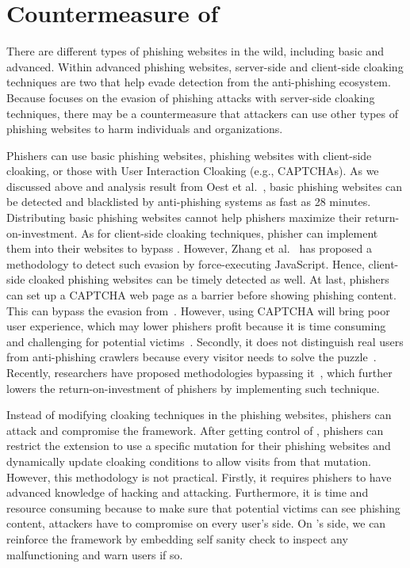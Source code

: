 \section{Countermeasure of \spartacus}


There are different types of phishing websites in the wild, including basic and advanced.
Within advanced phishing websites, server-side and client-side cloaking techniques are two that help evade detection from the anti-phishing ecosystem.
Because \spartacus focuses on the evasion of phishing attacks with server-side cloaking techniques,
there may be a countermeasure that attackers can use other types of phishing websites to harm individuals and organizations.

Phishers can use basic phishing websites, phishing websites with client-side cloaking, or those with User Interaction Cloaking (e.g., CAPTCHAs).
As we discussed above and analysis result from Oest et al.~\cite{oest2020phishtime}, basic phishing websites can be detected and blacklisted by anti-phishing systems as fast as 28 minutes.
Distributing basic phishing websites cannot help phishers maximize their return-on-investment.
As for client-side cloaking techniques,
phisher can implement them into their websites to bypass \spartacus.
However, Zhang et al.~\cite{zhang2021crawlphish} has proposed a methodology to detect such evasion by force-executing JavaScript.
Hence, client-side cloaked phishing websites can be timely detected as well.
At last, phishers can set up a CAPTCHA web page as a barrier before showing phishing content.
This can bypass the evasion from~\spartacus.
However, using CAPTCHA will bring poor user experience, which may lower phishers profit because it is time consuming and challenging for potential victims~\cite{captcha}.
Secondly, it does not distinguish real users from anti-phishing crawlers because every visitor needs to solve the puzzle~\cite{captcha}.
Recently, researchers have proposed methodologies bypassing it~\cite{sivakorn2016m,stark2015captcha, zhang2021crawlphish}, which further lowers the return-on-investment of phishers by implementing such technique.

Instead of modifying cloaking techniques in the phishing websites,
phishers can attack and compromise the \spartacus framework.
After getting control of \spartacus, phishers can restrict the extension to use a specific mutation for their phishing websites and dynamically update cloaking conditions to allow visits from that mutation.
However, this methodology is not practical.
Firstly, it requires phishers to have advanced knowledge of hacking and attacking.
Furthermore, it is time and resource consuming because to make sure that potential victims can see phishing content, attackers have to compromise \spartacus on every user's side.
On \spartacus's side, we can reinforce the framework by embedding self sanity check to inspect any malfunctioning and warn users if so.

